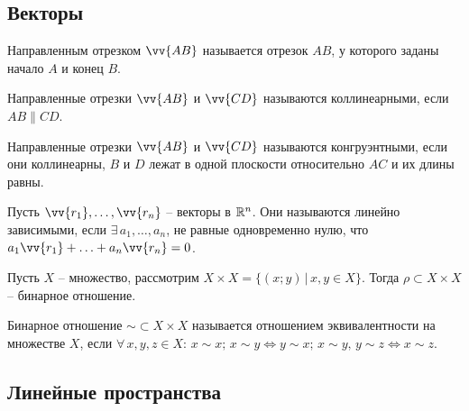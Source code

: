 \documentclass[12pt]{article}
\begin{document}
\subsection{Векторы}

\begin{definition}
    Направленным отрезком $\vv{AB}$ называется отрезок $AB$, у которого заданы начало $A$ и конец $B$.
\end{definition}
\begin{definition}
    Направленные отрезки $\vv{AB}$ и $\vv{CD}$ называются коллинеарными, если $AB\parallel CD$.
\end{definition}
\begin{definition}
    Направленные отрезки $\vv{AB}$ и $\vv{CD}$ называются конгруэнтными, если они коллинеарны, $B$ и $D$ лежат в одной плоскости относительно $AC$ и их длины равны.
\end{definition}
\begin{definition}
    Пусть $\vv{r_1},\ldots,\vv{r_n}$ – векторы в $\mathbb{R}^n$. Они называются линейно зависимыми, если $\exists\,a_1,\ldots,a_n$, не равные одновременно нулю, что $a_1\vv{r_1}+\ldots+a_n\vv{r_n}=0$.
\end{definition}
\begin{definition}
    Пусть $X$ – множество, рассмотрим $X\times X=\{(x;y)\,|\,x,y\in X\}$. Тогда $\rho\subset X\times X$ – бинарное отношение.
\end{definition}
\begin{definition}
    Бинарное отношение $\sim\subset X\times X$ называется отношением эквивалентности на множестве $X$, если $\forall\,x,y,z\in X:\,x\sim x;\,x\sim y\iff y\sim x;\,x\sim y,\,y\sim z\iff x\sim z$.
\end{definition}

\subsection{Линейные пространства}
\end{document}
